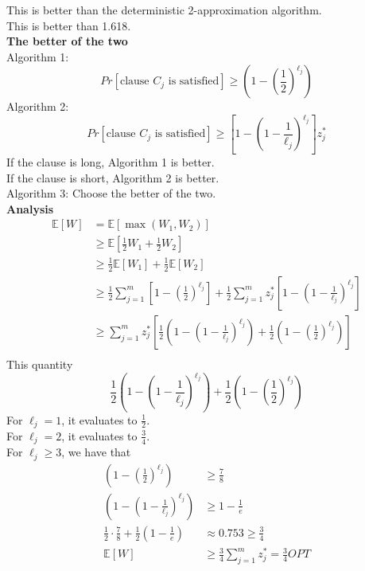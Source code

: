 \documentclass[onecolumn]{report}
\begin{document}
This is better than the deterministic 2-approximation algorithm.\\
This is better than 1.618.\\
\textbf{The better of the two}\\
Algorithm 1:
\begin{equation*}
    Pr[\text{clause } C_j \text{ is satisfied}] \geq \left(1-(\frac{1}{2})^{\ell_j}\right)
\end{equation*}
Algorithm 2:
\begin{equation*}
    Pr[\text{clause } C_j \text{ is satisfied}] \geq \left[1-\left(1-\frac{1}{\ell_j}\right)^{\ell_j}\right]z_j^*
\end{equation*}
If the clause is long, Algorithm 1 is better.\\
If the clause is short, Algorithm 2 is better.\\
Algorithm 3: Choose the better of the two.\\
\textbf{Analysis}\\
\begin{align*}
    \mathbb{E}[W] &= \mathbb{E}[\max(W_1, W_2)]\\
    &\geq \mathbb{E}\left[\frac{1}{2}W_1+\frac{1}{2}W_2\right]\\
    &\geq \frac{1}{2}\mathbb{E}[W_1]+\frac{1}{2}\mathbb{E}[W_2]\\
    &\geq \frac{1}{2}\sum_{j=1}^{m}\left[1-(\frac{1}{2})^{\ell_j}\right]+\frac{1}{2}\sum_{j=1}^{m}z_j^*\left[1-\left(1-\frac{1}{\ell_j}\right)^{\ell_j}\right]\\
    &\geq \sum_{j=1}^{m}z_j^*\left[\frac{1}{2}\left(1-\left(1-\frac{1}{\ell_j}\right)^{\ell_j}\right)+\frac{1}{2}\left(1-\left(\frac{1}{2}\right)^{\ell_j}\right)\right]\\
\end{align*}
This quantity
\begin{equation*}
    \frac{1}{2}\left(1-\left(1-\frac{1}{\ell_j}\right)^{\ell_j}\right)+\frac{1}{2}\left(1-\left(\frac{1}{2}\right)^{\ell_j}\right)
\end{equation*}
For $\ell_j=1$, it evaluates to $\frac{1}{2}$.\\
For $\ell_j=2$, it evaluates to $\frac{3}{4}$.\\
For $\ell_j \geq 3$, we have that
\begin{align*}
    \left(1-(\frac{1}{2})^{\ell_j}\right) &\geq \frac{7}{8}\\
    \left(1-\left(1-\frac{1}{\ell_j}\right)^{\ell_j}\right) &\geq 1-\frac{1}{e}\\
    \frac{1}{2}\cdot \frac{7}{8}+\frac{1}{2}\left(1-\frac{1}{e}\right) &\approx 0.753 \geq \frac{3}{4}\\
    \mathbb{E}[W] &\geq \frac{3}{4}\sum_{j=1}^{m}z_j^*= \frac{3}{4}OPT
\end{align*}
\end{document}
